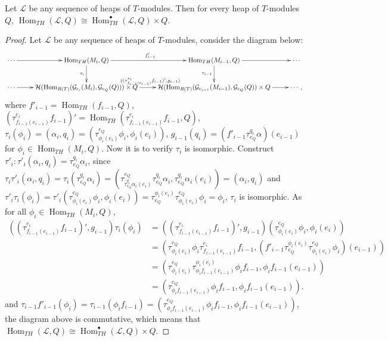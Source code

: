 \documentclass[11pt, twoside]{article}
\begin{document}
\begin{proposition}
Let $\mathcal{L}$ be any sequence of heaps of $T$-modules. Then for every heap of $T$-modules $Q$, $\operatorname{Hom}_{TH}(\mathcal{L}, Q) \cong \operatorname{Hom}^\bullet_{TH}(\mathcal{L}, Q)\times Q$.
\end{proposition}
\begin{proof}
Let $\mathcal{L}$ be any sequence of heaps of $T$-modules, consider the diagram below:
$$ \xymatrix{\cdots \ar[r] & \operatorname{Hom}_{TH}(M_i, Q) \ar[d]_{\tau_{i}} \ar[r]^{f'_{i-1}} & \operatorname{Hom}_{TH}(M_{i-1}, Q) \ar[d]_{\tau_{i-1}} \ar[r] & \cdots \\
  \cdots \ar[r] & \mathcal{H}(\operatorname{Hom}_{R(T)}(\mathcal{G}_{e_{i}}(M_{i}), \mathcal{G}_{e_Q}(Q)))\times Q \ar[r]^{((\tau^{e_i}_{f_{i-1}(e_{i-1})}f_{i-1})', g_{i-1})} & \mathcal{H}(\operatorname{Hom}_{R(T)}(\mathcal{G}_{e_{i-1}}(M_{i-1}), \mathcal{G}_{e_Q}(Q))\times Q \ar[r] & \cdots ,}$$
where $f'_{i-1} = \operatorname{Hom}_{TH}(f_{i-1},Q)$, $(\tau^{e_i}_{f_{i-1}(e_{i-1})}f_{i-1})'=\operatorname{Hom}_{TH}(\tau^{e_i}_{f_{i-1}(e_{i-1})}f_{i-1},Q)$, $\tau_{i}(\phi_i) = (\alpha_i,q_i)=(\tau_{\phi_i(e_i)}^{e_Q}\phi_i,\phi_i(e_i))$, $g_{i-1}(q_i)=(f'_{i-1}\tau^{q_i}_{e_Q}\alpha)(e_{i-1})$ for $\phi_i \in \operatorname{Hom}_{TH}(M_i, Q)$. Now it is to verify $\tau_i$ is isomorphic. Construct $\tau'_i: \tau'_i(\alpha_i ,q_i)=\tau^{q_i}_{e_Q}\alpha_i$, since $\tau_i\tau'_i(\alpha_i ,q_i)=\tau_i(\tau^{q_i}_{e_Q}\alpha_i)=(\tau^{e_Q}_{\tau^{q_i}_{e_Q}\alpha_i(e_i)}\tau^{q_i}_{e_Q}\alpha_i,\tau^{q_i}_{e_Q}\alpha_i(e_i))=(\alpha_i ,q_i)$ and $\tau'_i\tau_i(\phi_i)=\tau'_i(\tau_{\phi_i(e_i)}^{e_Q}\phi_i,\phi_i(e_i))=\tau^{\phi_i(e_i)}_{e_Q}\tau_{\phi_i(e_i)}^{e_Q}\phi_i=\phi_i$, $\tau_i$ is isomorphic. As for all $\phi_i \in \operatorname{Hom}_{TH}(M_i, Q)$,
\begin{align*}
((\tau^{e_i}_{f_{i-1}(e_{i-1})}f_{i-1})', g_{i-1}) \tau_i(\phi_i)&=((\tau^{e_i}_{f_{i-1}(e_{i-1})}f_{i-1})', g_{i-1})(\tau_{\phi_i(e_i)}^{e_Q}\phi_i,\phi_i(e_i))\\
&=(\tau_{\phi_i(e_i)}^{e_Q}\phi_i\tau^{e_i}_{f_{i-1}(e_{i-1})}f_{i-1},(f'_{i-1}\tau^{\phi_i(e_i)}_{e_Q}\tau_{\phi_i(e_i)}^{e_Q}\phi_i)(e_{i-1}))\\
&=(\tau_{\phi_i(e_i)}^{e_Q}\tau^{\phi_i(e_i)}_{\phi_i f_{i-1}(e_{i-1})}\phi_i f_{i-1},\phi_i f_{i-1}(e_{i-1}))\\
&=(\tau^{e_Q}_{\phi_i f_{i-1}(e_{i-1})}\phi_i f_{i-1},\phi_i f_{i-1}(e_{i-1})).
\end{align*}
and $\tau_{i-1}f'_{i-1}(\phi_i)=\tau_{i-1}(\phi_i f_{i-1})=(\tau^{e_Q}_{\phi_i f_{i-1}(e_{i-1})}\phi_i f_{i-1},\phi_i f_{i-1}(e_{i-1}))$, the diagram above is commutative, which means that $\operatorname{Hom}_{TH}(\mathcal{L}, Q) \cong \operatorname{Hom}^\bullet_{TH}(\mathcal{L}, Q)\times Q$.
\end{proof}
\end{document}
